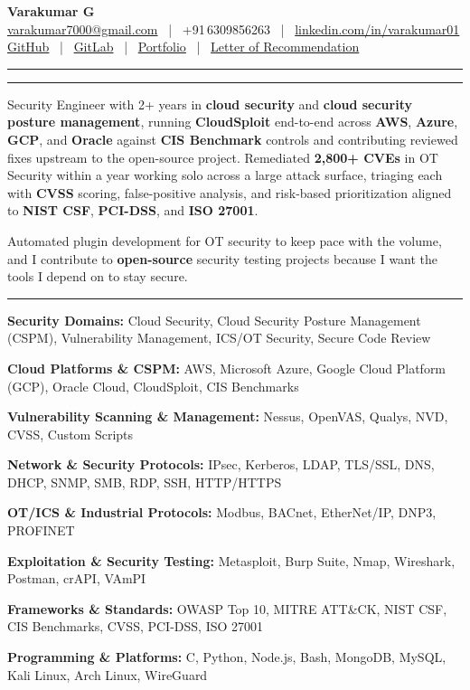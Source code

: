 \documentclass[9pt,a4paper]{extarticle}
\newcommand{\resumeSection}[1]{%
  \vspace{5pt}%
  \noindent{\large\bfseries\MakeUppercase{#1}}\par%
  \vspace{-7pt}%
  \noindent\rule{\textwidth}{0.5pt}%
  \par\vspace{0pt}%
}
\newcommand{\techrow}[2]{\noindent\textbf{#1} #2\par}
\begin{document}

\vspace*{-8pt}
\begin{center}
  {\LARGE\bfseries Varakumar G}\\[2pt]
  \href{mailto:varakumar7000@gmail.com}{varakumar7000@gmail.com}
  ~|~ +91\,6309856263
  ~|~ \href{https://www.linkedin.com/in/varakumar01}{linkedin.com/in/varakumar01}\\[1pt]
  \href{https://github.com/varakumar01}{GitHub}
  ~|~ \href{https://gitlab.com/Tony_01}{GitLab}
  ~|~ \href{https://portfolio.dragnux.com}{Portfolio}
  ~|~ \href{https://drive.google.com/file/d/17c5RtAgWn5TdRQUxnDIvLQogPoUoxgO_/view?pli=1}{Letter of Recommendation}
\end{center}
\vspace{-1pt}\noindent\rule{\textwidth}{0.7pt}

\resumeSection{Professional Summary}

Security Engineer with 2+ years in \textbf{cloud security} and \textbf{cloud security posture management}, running \textbf{CloudSploit} end-to-end across \textbf{AWS}, \textbf{Azure}, \textbf{GCP}, and \textbf{Oracle} against \textbf{CIS Benchmark} controls and contributing reviewed fixes upstream to the open-source project. Remediated \textbf{2,800+ CVEs} in OT Security within a year working solo across a large attack surface, triaging each with \textbf{CVSS} scoring, false-positive analysis, and risk-based prioritization aligned to \textbf{NIST CSF}, \textbf{PCI-DSS}, and \textbf{ISO 27001}.

Automated plugin development for OT security to keep pace with the volume, and I contribute to \textbf{open-source} security testing projects because I want the tools I depend on to stay secure.

\resumeSection{Technical Skills}

\techrow{Security Domains:}{Cloud Security, Cloud Security Posture Management (CSPM), Vulnerability Management, ICS/OT Security, Secure Code Review}
\techrow{Cloud Platforms \& CSPM:}{AWS, Microsoft Azure, Google Cloud Platform (GCP), Oracle Cloud, CloudSploit, CIS Benchmarks}
\techrow{Vulnerability Scanning \& Management:}{Nessus, OpenVAS, Qualys, NVD, CVSS, Custom Scripts}
\techrow{Network \& Security Protocols:}{IPsec, Kerberos, LDAP, TLS/SSL, DNS, DHCP, SNMP, SMB, RDP, SSH, HTTP/HTTPS}
\techrow{OT/ICS \& Industrial Protocols:}{Modbus, BACnet, EtherNet/IP, DNP3, PROFINET}
\techrow{Exploitation \& Security Testing:}{Metasploit, Burp Suite, Nmap, Wireshark, Postman, crAPI, VAmPI}
\techrow{Frameworks \& Standards:}{OWASP Top 10, MITRE ATT\&CK, NIST CSF, CIS Benchmarks, CVSS, PCI-DSS, ISO 27001}
\techrow{Programming \& Platforms:}{C, Python, Node.js, Bash, MongoDB, MySQL, Kali Linux, Arch Linux, WireGuard}
\end{document}
